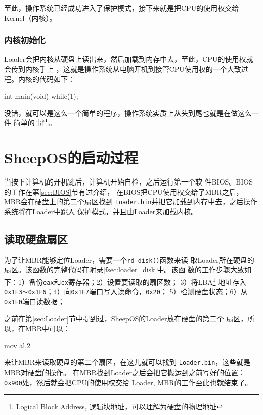 至此，操作系统已经成功进入了保护模式，接下来就是把CPU的使用权交给Kernel（内核）。

\subsubsection{内核初始化}

Loader会把内核从硬盘上读出来，然后加载到内存中去，至此，CPU的使用权就会传到内核手上
，这就是操作系统从电脑开机到接管CPU使用权的一个大致过程。内核的代码如下：

\begin{codeblock}
\begin{ccode}
int main(void)
{
    while(1);
}
\end{ccode}  
\end{codeblock}

没错，就可以是这么一个简单的程序，操作系统实质上从头到尾也就是在做这么一件
简单的事情。

\section{SheepOS的启动过程}
\label{sec:booting}

当按下计算机的开机键后，计算机开始自检，之后运行第一个软
件BIOS。BIOS的工作在第\ref{sec:BIOS}节有过介绍，
在BIOS把CPU使用权交给了MBR之后，MBR会在硬盘上的第二个扇区找到
\texttt{Loader.bin}并把它加载到内存中去，之后操作系统将在Loader中跳入
保护模式，并且由Loader来加载内核。

\subsection{读取硬盘扇区}

为了让MBR能够定位Loader，需要一个\texttt{rd\_disk()}函数来读
取Loader所在硬盘的扇区。该函数的完整代码在附录\ref{fsec:loader_disk}中。该函
数的工作步骤大致如下：1）备份\texttt{eax}和\texttt{cx}寄存器；2）设置要读取的扇区数；
3）将LBA\footnote{Logical Block Address, 逻辑块地址，可以理解为硬盘的物理地址}
地址存入\texttt{0x1F3～0x1F6}；4）向\texttt{0x1F7}端口写入读命令，\texttt{0x20}；
5）检测硬盘状态；6）从\texttt{0x1F0}端口读数据；

之前在第\ref{sec:Loader}节中提到过，SheepOS的Loader放在硬盘的第二个
扇区，所以，在MBR中可以：
\begin{codeblock}
  \begin{nasmcode}
    mov al,2
  \end{nasmcode}
\end{codeblock}
来让MBR来读取硬盘的第二个扇区，在这儿就可以找到
\texttt{Loader.bin}，这些就是MBR对硬盘的操作。
在MBR找到Loader之后会把它搬运到之前写好的位置：\texttt{0x900}处，然后就会把CPU的使用权交给
Loader, MBR的工作至此也就结束了。

